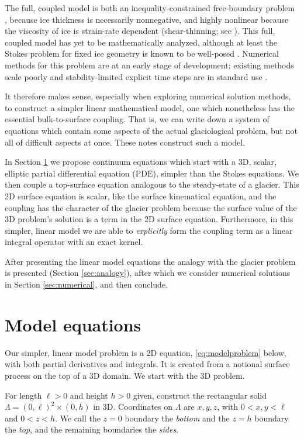 \documentclass[letterpaper,final,12pt,reqno]{amsart}
\theoremstyle{cstyle}
\theoremstyle{cstyle*}
\theoremstyle{dstyle}
\numberwithin{equation}{section}
\begin{document}
The full, coupled model is both an inequality-constrained free-boundary problem \cite{JouvetBueler2012}, because ice thickness is necessarily nonnegative, and highly nonlinear because the viscosity of ice is strain-rate dependent (shear-thinning; see \cite{GreveBlatter2009}).  This full, coupled model has yet to be mathematically analyzed, although at least the Stokes problem for fixed ice geometry is known to be well-posed \cite{JouvetRappaz2011}.  Numerical methods for this problem are at an early stage of development; existing methods scale poorly and stability-limited explicit time steps are in standard use \cite{Bueler2022preprint}.

It therefore makes sense, especially when exploring numerical solution methods, to construct a simpler linear mathematical model, one which nonetheless has the essential bulk-to-surface coupling.  That is, we can write down a system of equations which contain some aspects of the actual glaciological problem, but not all of difficult aspects at once.  These notes construct such a model.

In Section \ref{sec:model} we propose continuum equations which start with a 3D, scalar, elliptic partial differential equation (PDE), simpler than the Stokes equations.  We then couple a top-surface equation analogous to the steady-state of a glacier.  This 2D surface equation is scalar, like the surface kinematical equation, and the coupling has the character of the glacier problem because the surface value of the 3D problem's solution is a term in the 2D surface equation.  Furthermore, in this simpler, linear model we are able to \emph{explicitly} form the coupling term as a linear integral operator with an exact kernel.

After presenting the linear model equations the analogy with the glacier problem is presented (Section \ref{sec:analogy}), after which we consider numerical solutions in Section \ref{sec:numerical}, and then conclude.


\section{Model equations} \label{sec:model}

Our simpler, linear model problem is a 2D equation, \eqref{eq:modelproblem} below, with both partial derivatives and integrals.  It is created from a notional surface process on the top of a 3D domain.  We start with the 3D problem.

For length $\ell>0$ and height $h>0$ given, construct the rectangular solid $\Lambda = (0,\ell)^2\times (0,h)$ in 3D.  Coordinates on $\Lambda$ are $x,y,z$, with $0<x,y<\ell$ and $0<z<h$.  We call the $z=0$ boundary the \emph{bottom} and the $z=h$ boundary the \emph{top}, and the remaining boundaries the \emph{sides}.
\end{document}
